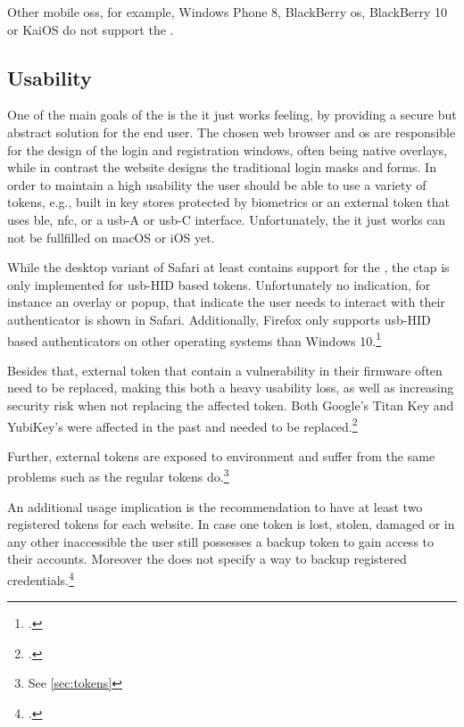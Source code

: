 Other mobile \glspl{os}, for example, Windows Phone 8, BlackBerry \gls{os}, BlackBerry 10 or KaiOS do not support the \wa.

\subsection{Usability}

One of the main goals of the \wa{} is the \frqq it just works\flqq{} feeling, by providing a secure but abstract solution for the end user. The chosen web browser and \gls{os} are responsible for the design of the login and registration windows, often being native overlays, while in contrast the website designs the traditional login masks and forms. In order to maintain a high usability the user should be able to use a variety of tokens, e.g., built in key stores protected by biometrics or an external token that uses \gls{ble}, \gls{nfc}, or a \gls{usb}-A or \gls{usb}-C interface. Unfortunately, the \frqq it just works\flqq{} can not be fullfilled on macOS or iOS yet.

While the desktop variant of Safari at least contains support for the \wa, the \gls{ctap} is only implemented for \gls{usb}-HID based tokens. Unfortunately no indication, for instance an overlay or popup, that indicate the user needs to interact with their authenticator is shown in Safari. Additionally, Firefox only supports \gls{usb}-HID based authenticators on other operating systems than Windows 10.\footcites[See][]{rust-authenticator}

Besides that, external token that contain a vulnerability in their firmware often need to be replaced, making this both a heavy usability loss, as well as increasing security risk when not replacing the affected token. Both Google's Titan Key and YubiKey's were affected in the past and needed to be replaced.\footcites[See][]{yubikey-heise}[See][]{titan-key}

Further, external tokens are exposed to environment and suffer from the same problems such as the regular tokens do.\footnote{See \autoref{sec:tokens}}

An additional usage implication is the recommendation to have at least two registered tokens for each website.  In case one token is lost, stolen, damaged or in any other inaccessible the user still possesses a backup token to gain access to their accounts. Moreover the \wa{} does not specify a way to backup registered credentials.\footcites[See][Chapter 13.6]{w3c}
